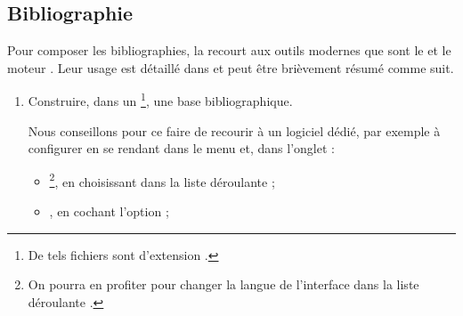 \subsection{Bibliographie}
\label{sec-bibliographie}

Pour composer les bibliographies, la \gzt{} recourt aux outils modernes que sont
le  et le moteur . Leur usage est détaillé dans
\autocite{Bitouze} et peut être brièvement résumé comme suit.
\begin{enumerate}
\item Construire, dans un \footnote{De tels
    fichiers sont d'extension .}, une base bibliographique.

  Nous conseillons pour ce faire de recourir à un logiciel dédié, par exemple
  \href{http://jabref.sourceforge.net/}{} à configurer en se
  rendant dans le menu  et, dans l'onglet :
  \begin{itemize}
  \item {}\footnote{On pourra en profiter pour changer la langue de
      l'interface dans la liste déroulante .}, en choisissant
     dans la liste déroulante  ;
  \item {}, en cochant l'option  ;
  \end{itemize}


\end{enumerate}
